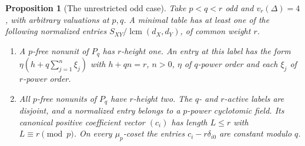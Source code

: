 \documentclass[11pt,a4paper]{article}
\numberwithin{equation}{section}
\newtheorem{proposition}[theorem]{Proposition}
\theoremstyle{remark}
\newcommand{\lcm}{\operatorname{lcm}}
\begin{document}
\begin{proposition}[The unrestricted odd case]\label{fam:Q:3.1}\label{fam:Q:n:quart:alternative}
Take $p<q<r$ odd and $v_r(\Delta)=4$, with arbitrary valuations
at $p,q$. A minimal table has at least one of the following normalized
entries $S_{XY}/\lcm(d_X,d_Y)$, of common weight $r$.
\begin{enumerate}
\item A $p$-free nonunit of $P_q$ has $r$-height one. An
entry at this label has the form
$\eta(h+q\sum_{j=1}^n\xi_j)$ with $h+qn=r$, $n>0$,
$\eta$ of $q$-power order and each $\xi_j$ of $r$-power order.
\item All $p$-free nonunits of $P_q$ have $r$-height two.
The $q$- and $r$-active labels are disjoint, and a normalized
entry belongs to a $p$-power cyclotomic field. Its canonical
positive coefficient vector $(c_i)$ has length $L\le r$ with
$L\equiv r\pmod p$. On every $\mu_p$-coset the entries
$c_i-r\delta_{i0}$ are constant modulo $q$.
\end{enumerate}
\end{proposition}
\end{document}
